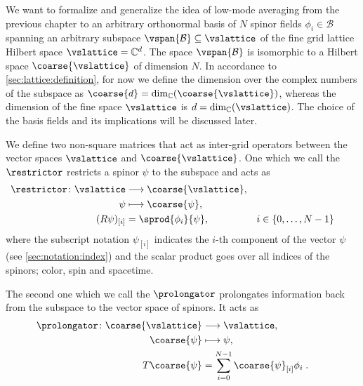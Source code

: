 We want to formalize and generalize the idea of low-mode averaging from the previous chapter to an arbitrary orthonormal basis of $N$ spinor fields $\phi_{i} \in \mathcal{B}$ spanning an arbitrary subspace $\vspan{\mathcal{B}} \subseteq \vslattice$ of the fine grid lattice Hilbert space $\vslattice = \mathbb{C}^d$.
The space $\vspan{\mathcal{B}}$ is isomorphic to a Hilbert space $\coarse{\vslattice}$ of dimension $N$.
In accordance to \cref{sec:lattice:definition}, for now we define the dimension over the complex numbers of the subspace as $\coarse{d} = \dim_{\mathbb{C}}(\coarse{\vslattice})$, whereas the dimension of the fine space $\vslattice$ is $d = \dim_{\mathbb{C}}(\vslattice)$.
The choice of the basis fields and its implications will be discussed later.

We define two non-square matrices that act as inter-grid operators between the vector spaces $\vslattice$ and $\coarse{\vslattice}$.
One which we call the  $\restrictor$ restricts a spinor $\psi$ to the subspace and acts as
\begin{align}
&\begin{aligned}
\restrictor \colon
\vslattice &\longrightarrow \coarse{\vslattice}, \\
\psi       &\longmapsto     \coarse{\psi}, \\
(R \psi)_{[i]} &= \sprod{\phi_{i}}{\psi},
& i &\in \{ 0, \ldots, N-1 \}
\end{aligned} \label{eq:R}
\end{align}
where the subscript notation $\psi_{[i]}$ indicates the $i$-th component of the vector $\psi$ (see \cref{sec:notation:index}) and the scalar product goes over all indices of the spinors; color, spin and spacetime.

The second one which we call the  $\prolongator$ prolongates information back from the subspace to the vector space of spinors.
It acts as
\begin{align}
&\begin{aligned}
\prolongator \colon
\coarse{\vslattice}  &\longrightarrow \vslattice, \\
\coarse{\psi}        &\longmapsto     \psi, \\
T \coarse{\psi} &= \sum_{i=0}^{N-1} \coarse{\psi}_{[i]} \phi_{i} \;. &
\end{aligned} \label{eq:T}
\end{align}

